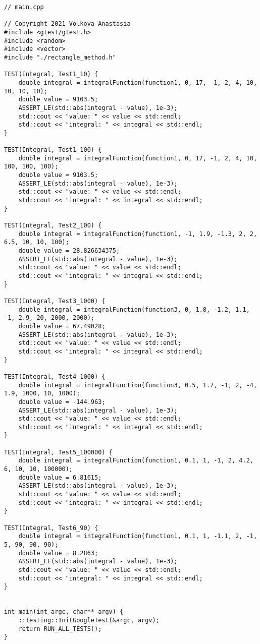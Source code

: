 \documentclass{report}
\begin{document}
\begin{lstlisting}
// main.cpp

// Copyright 2021 Volkova Anastasia
#include <gtest/gtest.h>
#include <random>
#include <vector>
#include "./rectangle_method.h"

TEST(Integral, Test1_10) {
    double integral = integralFunction(function1, 0, 17, -1, 2, 4, 10, 10, 10, 10);
    double value = 9103.5;
    ASSERT_LE(std::abs(integral - value), 1e-3);
    std::cout << "value: " << value << std::endl;
    std::cout << "integral: " << integral << std::endl;
}

TEST(Integral, Test1_100) {
    double integral = integralFunction(function1, 0, 17, -1, 2, 4, 10, 100, 100, 100);
    double value = 9103.5;
    ASSERT_LE(std::abs(integral - value), 1e-3);
    std::cout << "value: " << value << std::endl;
    std::cout << "integral: " << integral << std::endl;
}

TEST(Integral, Test2_100) {
    double integral = integralFunction(function1, -1, 1.9, -1.3, 2, 2, 6.5, 10, 10, 100);
    double value = 28.826634375;
    ASSERT_LE(std::abs(integral - value), 1e-3);
    std::cout << "value: " << value << std::endl;
    std::cout << "integral: " << integral << std::endl;
}

TEST(Integral, Test3_1000) {
    double integral = integralFunction(function3, 0, 1.8, -1.2, 1.1, -1, 2.9, 20, 2000, 2000);
    double value = 67.49028;
    ASSERT_LE(std::abs(integral - value), 1e-3);
    std::cout << "value: " << value << std::endl;
    std::cout << "integral: " << integral << std::endl;
}

TEST(Integral, Test4_1000) {
    double integral = integralFunction(function3, 0.5, 1.7, -1, 2, -4, 1.9, 1000, 10, 1000);
    double value = -144.963;
    ASSERT_LE(std::abs(integral - value), 1e-3);
    std::cout << "value: " << value << std::endl;
    std::cout << "integral: " << integral << std::endl;
}

TEST(Integral, Test5_100000) {
    double integral = integralFunction(function1, 0.1, 1, -1, 2, 4.2, 6, 10, 10, 100000);
    double value = 6.81615;
    ASSERT_LE(std::abs(integral - value), 1e-3);
    std::cout << "value: " << value << std::endl;
    std::cout << "integral: " << integral << std::endl;
}

TEST(Integral, Test6_90) {
    double integral = integralFunction(function1, 0.1, 1, -1.1, 2, -1, 5, 90, 90, 90);
    double value = 8.2863;
    ASSERT_LE(std::abs(integral - value), 1e-3);
    std::cout << "value: " << value << std::endl;
    std::cout << "integral: " << integral << std::endl;
}


int main(int argc, char** argv) {
    ::testing::InitGoogleTest(&argc, argv);
    return RUN_ALL_TESTS();
}

\end{lstlisting}
\end{document}
